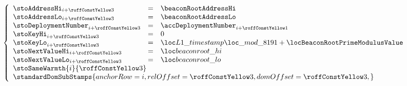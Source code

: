 \item[\underline{\underline{Storing the \inst{BEACONROOT} in the state:}}] 
	\[
		\left\{ \begin{array}{lclr}
			\stoAddressHi        _{i + \roffTxSkipSysiBeaconRootSystemContractStorageSetBeaconRoot} & = & \beaconRootAddressHi                                                       \\
			\stoAddressLo        _{i + \roffTxSkipSysiBeaconRootSystemContractStorageSetBeaconRoot} & = & \beaconRootAddressLo                                                       \\
			\stoDeploymentNumber _{i + \roffTxSkipSysiBeaconRootSystemContractStorageSetBeaconRoot} & = & \accDeploymentNumber _{i + \roffTxSkipSysiBeaconRootSystemContractAccount} \\
			\stoKeyHi            _{i + \roffTxSkipSysiBeaconRootSystemContractStorageSetBeaconRoot} & = & 0                                                                          \\
			\stoKeyLo            _{i + \roffTxSkipSysiBeaconRootSystemContractStorageSetBeaconRoot} & = & \locLineaTimestampModuloPrime + \locBeaconRootPrimeModulusValue            \\
			\stoNextValueHi      _{i + \roffTxSkipSysiBeaconRootSystemContractStorageSetBeaconRoot} & = & \locBeaconRootHi                                                           \\
			\stoNextValueLo      _{i + \roffTxSkipSysiBeaconRootSystemContractStorageSetBeaconRoot} & = & \locBeaconRootLo                                                           \\
			\multicolumn{3}{l}{\stoSameWarmth  {i}{\roffTxSkipSysiBeaconRootSystemContractStorageSetBeaconRoot} } \\
			\multicolumn{3}{l}{
				\standardDomSubStamps {
					anchorRow = i                                                           ,
					relOffset = \roffTxSkipSysiBeaconRootSystemContractStorageSetBeaconRoot ,
					domOffset = \roffTxSkipSysiBeaconRootSystemContractStorageSetBeaconRoot ,
				}} \\
		\end{array} \right.
	\]
